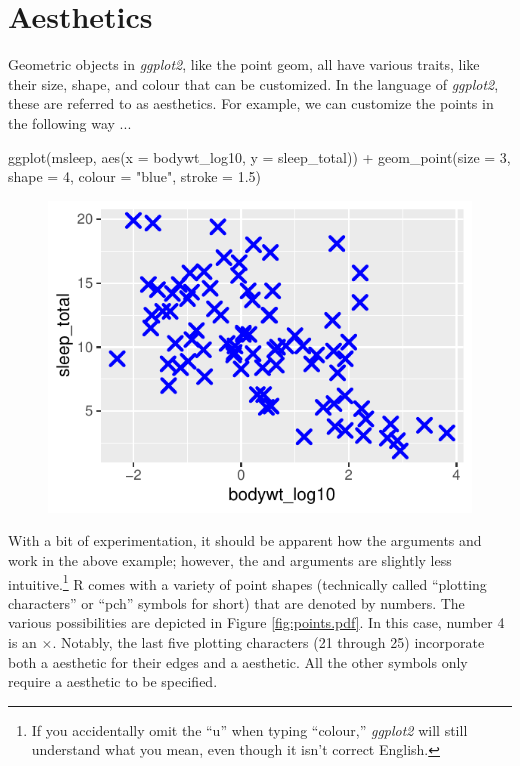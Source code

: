 \section{Aesthetics}

Geometric objects in \textit{ggplot2}, like the point geom, all have various traits, like their size, shape, and colour that can be customized.  In the language of \textit{ggplot2}, these are referred to as \gls{aesthetics}.  For example, we can customize the points in the following way ...

\begin{inR}
ggplot(msleep, aes(x = bodywt_log10, y = sleep_total)) +
  geom_point(size = 3, 
             shape = 4, 
             colour = "blue", 
             stroke = 1.5)
\end{inR}

\vspace{1em}

\begin{figure}[H]
\includegraphics[scale = 0.75]{graphics/ch2Figs/ggEx_5.pdf}
\end{figure}

With a bit of experimentation, it should be apparent how the arguments  and  work in the above example; however, the  and  arguments are slightly less intuitive.\footnote{If you accidentally omit the ``u'' when typing ``colour,'' \textit{ggplot2} will still understand what you mean, even though it isn't correct English.} R comes with a variety of point shapes (technically called ``plotting characters'' or ``\gls{pch}'' symbols for short) that are denoted by numbers. The various possibilities are depicted in Figure \ref{fig:points.pdf}.  In this case, number 4 is an $\times$.  Notably, the last five plotting characters (21 through 25) incorporate both a  aesthetic for their edges and a  aesthetic. All the other symbols only require a  aesthetic to be specified.

